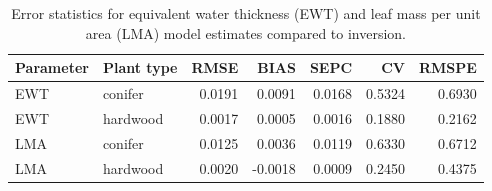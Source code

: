 \begin{table}[ht]
\centering
\begin{tabular}{llrrrrr}
  \hline
Parameter & Plant type & RMSE & BIAS & SEPC & CV & RMSPE \\ 
  \hline
EWT & conifer & 0.0191 & 0.0091 & 0.0168 & 0.5324 & 0.6930 \\ 
  EWT & hardwood & 0.0017 & 0.0005 & 0.0016 & 0.1880 & 0.2162 \\ 
  LMA & conifer & 0.0125 & 0.0036 & 0.0119 & 0.6330 & 0.6712 \\ 
  LMA & hardwood & 0.0020 & -0.0018 & 0.0009 & 0.2450 & 0.4375 \\ 
   \hline
\end{tabular}
\caption{ Error statistics for equivalent water thickness (EWT) and leaf mass per unit area (LMA) model estimates compared to inversion. } 
\label{tab:water-lma}
\end{table}